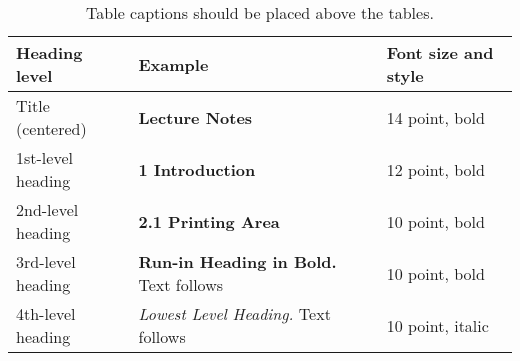 \begin{table}
  \caption{Table captions should be placed above the tables.}\label{tab1}
  \begin{tabular}{|l|l|l|}
  \hline
  Heading level &  Example & Font size and style\\
  \hline
  Title (centered) &  {\Large\bfseries Lecture Notes} & 14 point, bold\\
  1st-level heading &  {\large\bfseries 1 Introduction} & 12 point, bold\\
  2nd-level heading & {\bfseries 2.1 Printing Area} & 10 point, bold\\
  3rd-level heading & {\bfseries Run-in Heading in Bold.} Text follows & 10 point, bold\\
  4th-level heading & {\itshape Lowest Level Heading.} Text follows & 10 point, italic\\
  \hline
  \end{tabular}
\end{table}

